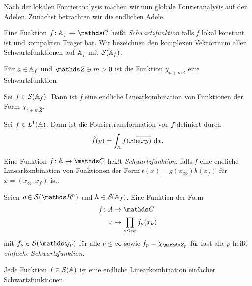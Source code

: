 Nach der lokalen Fourieranalysis machen wir nun globale Fourieranalysis auf den Adelen.
Zunächst betrachten wir die endlichen Adele.

\begin{defi}
Eine Funktion $f \colon \A_f \to \C$ heißt \emph{Schwartzfunktion}
falls $f$ lokal konstant ist und kompakten Träger hat.
Wir bezeichnen den komplexen Vektorraum aller Schwartzfunktionen auf $\mathbb{A}_f$ mit $\mathcal{S}(\mathbb{A}_f)$.
\end{defi}

\begin{bsp}
Für $a \in \mathbb{A}_f$ und $\Z \ni m>0$ ist die Funktion $\chi_{a+m\hat{Z}}$ eine Schwartzfunktion.
\end{bsp}

\begin{prop}
Sei $ f\in \mathcal{S}(\mathbb{A}_f)$. Dann ist $f$ eine endliche Linearkombination
von Funktionen der Form $\chi_{a+m\hat{Z}}$.
\end{prop}

\begin{defi}
Sei $f\in \mathit{L}^1(\mathbb{A})$. Dann ist die Fouriertransformation von $f$ definiert durch
\begin{align*}
\hat{f}(y)=\int_{\mathbb{A}} f(x)\overline{\mathrm{e}(xy)}~\mathrm{d}x.
\end{align*}
\end{defi}

\begin{defi}
Eine Funktion $f \colon \A \to \C$ heißt \emph{Schwartzfunktion}, falls $f$ eine endliche Linearkombination von Funktionen der Form
$t(x)=g(x_\infty)h(x_f)$ für $x=(x_\infty,x_f)$ ist.
\end{defi}

\begin{defi}
Seien $g\in \mathcal{S}(\Rn)$ und $h\in \mathcal{S}(\mathbb{A}_f)$.
Eine Funktion der Form
\begin{align*}
f \colon A &\to \C\\
x &\mapsto \prod_{\nu \leq \infty} f_\nu(x_\nu)
\end{align*}
mit $f_\nu \in \mathcal{S}(\Q_\nu)$ für alle $\nu \leq \infty$
sowie $f_p=\chi_{\Z_p}$ für fast alle $p$
heißt \emph{einfache Schwartzfunktion}.
\end{defi}

\begin{lem}
Jede Funktion $f \in \mathcal{S}(\mathbb{A})$ ist eine endliche Linearkombination einfacher Schwartzfunktionen.
\end{lem}

